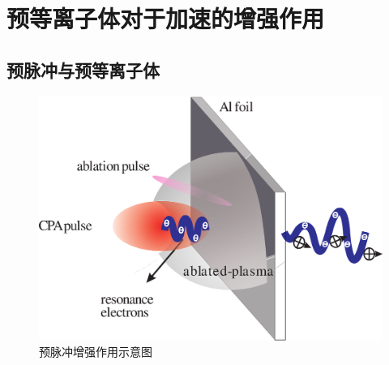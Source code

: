 

\chapter{预等离子体对于加速的增强作用}
\label{chap:preplasmaEhancement}

\section{}



\section{预脉冲与预等离子体}
\begin{figure}[!htbp]
  \centering
  \includegraphics[width=\MyFactor\textwidth]{Img/enhancement.eps}
  \caption{预脉冲增强作用示意图}
  \label{fig:prepulse2012}
\end{figure}




